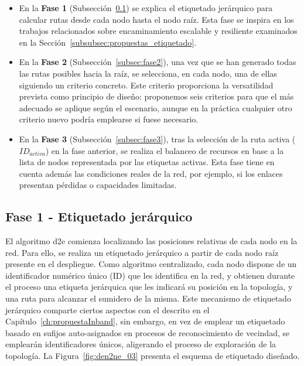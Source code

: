 \begin{itemize}
    \item En la \textbf{Fase 1} (Subsección~\ref{subsec:fase1}) se explica el etiquetado jerárquico para calcular rutas desde cada nodo hasta el nodo raíz. Esta fase se inspira en los trabajos relacionados sobre encaminamiento escalable y resiliente examinados en la Sección~\ref{subsubsec:propuestas_etiquetado}.
    
    \item En la \textbf{Fase 2} (Subsección~\ref{subsec:fase2}), una vez que se han generado todas las rutas posibles hacia la raíz, se selecciona, en cada nodo, una de ellas siguiendo un criterio concreto. Este criterio proporciona la versatilidad prevista como principio de diseño: proponemos seis criterios para que el más adecuado se aplique según el escenario, aunque en la práctica cualquier otro criterio nuevo podría emplearse si fuese necesario.
    
    \item En la \textbf{Fase 3} (Subsección~\ref{subsec:fase3}), tras la selección de la ruta activa ($ID_{activa}$) en la fase anterior, se realiza el balanceo de recursos en base a la lista de nodos representada por las etiquetas activas. Esta fase tiene en cuenta además las condiciones reales de la red, por ejemplo, si los enlaces presentan pérdidas o capacidades limitadas.
\end{itemize}


\subsection{Fase 1 - Etiquetado jerárquico}
\label{subsec:fase1}

El algoritmo \gls{d2e} comienza localizando las posiciones relativas de cada nodo en la red. Para ello, se realiza un etiquetado jerárquico a partir de cada nodo raíz presente en el despliegue. Como algoritmo centralizado, cada nodo dispone de un identificador numérico único (ID) que les identifica en la red, y obtienen durante el proceso una etiqueta jerárquica que les indicará su posición en la topología, y una ruta para alcanzar el sumidero de la misma. Este mecanismo de etiquetado jerárquico comparte ciertos aspectos con el descrito en el Capítulo~\ref{ch:propuestaInband}, sin embargo, en vez de emplear un etiquetado basado en sufijos auto-asignados en procesos de reconocimiento de vecindad, se emplearán identificadores únicos, aligerando el proceso de exploración de la topología. La Figura~\ref{fig:den2ne_03} presenta el esquema de etiquetado diseñado. 


